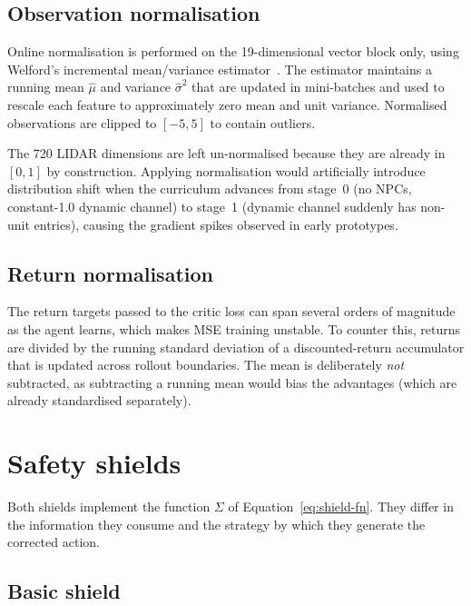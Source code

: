 \subsection{Observation normalisation}\label{sec:design-obsnorm}

Online normalisation is performed on the 19-dimensional vector block only, using Welford's
incremental mean/variance estimator~\cite{welford1962notes}. The estimator maintains a running
mean \(\hat{\mu}\) and variance \(\hat{\sigma}^2\) that are updated in mini-batches and used to
rescale each feature to approximately zero mean and unit variance. Normalised observations are
clipped to \([-5, 5]\) to contain outliers.

The 720 LIDAR dimensions are left un-normalised because they are already in \([0,1]\) by
construction. Applying normalisation would artificially introduce distribution shift when the
curriculum advances from stage~0 (no NPCs, constant-1.0 dynamic channel) to stage~1 (dynamic
channel suddenly has non-unit entries), causing the gradient spikes observed in early prototypes.

\subsection{Return normalisation}\label{sec:design-returnnorm}

The return targets passed to the critic loss can span several orders of magnitude as the agent
learns, which makes MSE training unstable. To counter this, returns are divided by the running
standard deviation of a discounted-return accumulator that is updated across rollout boundaries.
The mean is deliberately \emph{not} subtracted, as subtracting a running mean would bias the
advantages (which are already standardised separately).

\section{Safety shields}\label{sec:design-shields}

Both shields implement the function \(\Sigma\) of Equation~\eqref{eq:shield-fn}. They differ in
the information they consume and the strategy by which they generate the corrected action.

\subsection{Basic shield}\label{sec:design-basic-shield}

